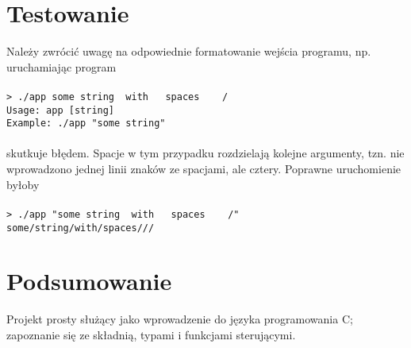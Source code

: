 \documentclass[a4paper, 12pt]{article}
\begin{document}
\section*{Testowanie}
Należy zwrócić uwagę na odpowiednie formatowanie wejścia programu, np. uruchamiając program
\\\\
\lstinline{> ./app some string  with   spaces    /}\\
\lstinline{Usage: app [string]}\\
\lstinline{Example: ./app "some string"}
\\\\
skutkuje błędem. Spacje w tym przypadku rozdzielają kolejne argumenty, tzn. nie wprowadzono jednej linii znaków ze spacjami, ale cztery. Poprawne uruchomienie byłoby
\\\\
\lstinline{> ./app "some string  with   spaces    /"}\\
\lstinline{some/string/with/spaces///}

\section*{Podsumowanie}
Projekt prosty służący jako wprowadzenie do języka programowania C; zapoznanie się ze składnią, typami i funkcjami sterującymi.
\end{document}
